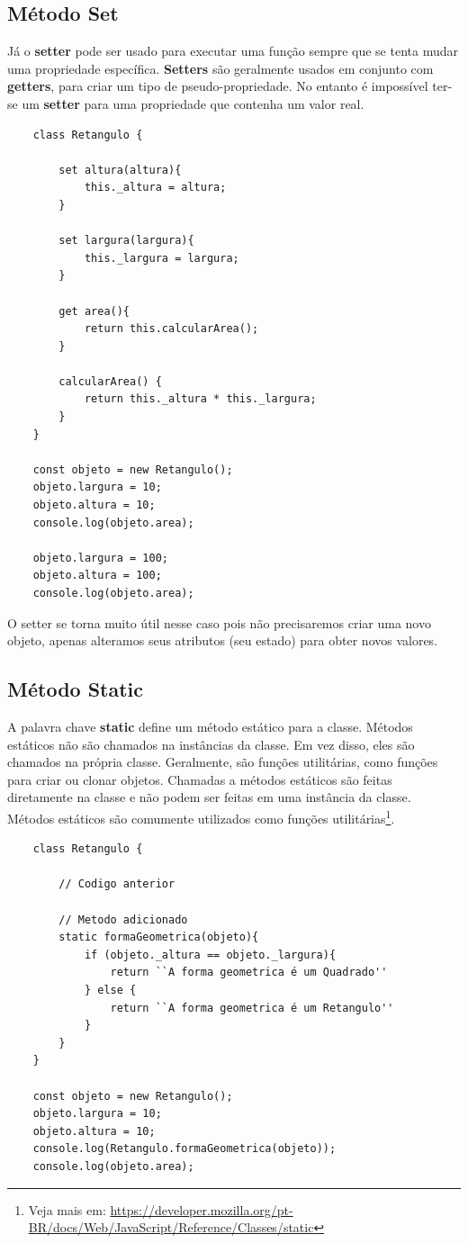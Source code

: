 \subsection{Método Set}

Já o \textbf{setter} pode ser usado para executar uma função sempre que se tenta mudar uma propriedade específica. \textbf{Setters} são geralmente usados em conjunto com \textbf{getters}, para criar um tipo de pseudo-propriedade. No entanto é impossível ter-se um \textbf{setter} para uma propriedade que contenha um valor real.

\begin{verbatim}
	class Retangulo {
		
		set altura(altura){
			this._altura = altura;
		}
		
		set largura(largura){
			this._largura = largura;
		}
		
		get area(){
			return this.calcularArea();
		}
		
		calcularArea() {
			return this._altura * this._largura;
		}
	}
	
	const objeto = new Retangulo();
	objeto.largura = 10;
	objeto.altura = 10;
	console.log(objeto.area);
	
	objeto.largura = 100;
	objeto.altura = 100;
	console.log(objeto.area);
\end{verbatim}

O setter se torna muito útil nesse caso pois não precisaremos criar uma novo objeto, apenas alteramos seus atributos (seu estado) para obter novos valores.

\subsection{Método Static}

A palavra chave \textbf{static} define um método estático para a classe. Métodos estáticos não são chamados na instâncias da classe. Em vez disso, eles são chamados na própria classe. Geralmente, são funções utilitárias, como funções para criar ou clonar objetos. Chamadas a métodos estáticos são feitas diretamente na classe e não podem ser feitas em uma instância da classe. Métodos estáticos são comumente utilizados como funções utilitárias\footnote{Veja mais em: \url{https://developer.mozilla.org/pt-BR/docs/Web/JavaScript/Reference/Classes/static}}.

\begin{verbatim}
	class Retangulo {
		
		// Codigo anterior
		
		// Metodo adicionado
		static formaGeometrica(objeto){
			if (objeto._altura == objeto._largura){
				return ``A forma geometrica é um Quadrado''
			} else {
				return ``A forma geometrica é um Retangulo''
			}
		}
	}
	
	const objeto = new Retangulo();
	objeto.largura = 10;
	objeto.altura = 10;
	console.log(Retangulo.formaGeometrica(objeto));
	console.log(objeto.area);
\end{verbatim}


